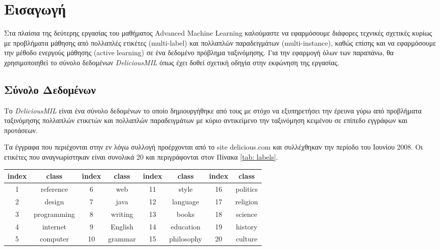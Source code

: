 \section{Εισαγωγή}
Στα πλαίσια της δεύτερης εργασίας του μαθήματος Advanced Machine Learning καλούμαστε να εφαρμόσουμε διάφορες τεχνικές σχετικές κυρίως με προβλήματα μάθησης από πολλαπλές ετικέτες (multi-label) και πολλαπλών παραδειγμάτων (multi-instance), καθώς επίσης και να εφαρμόσουμε την μέθοδο ενεργούς μάθησης (active learning) σε ένα δεδομένο πρόβλημα ταξινόμησης. 
Για την εφαρμογή όλων των παραπάνω, θα χρησιμοποιηθεί το σύνολο δεδομένων \emph{DeliciousMIL} όπως έχει δοθεί σχετική οδηγία στην εκφώνηση της εργασίας.

\subsection{Σύνολο Δεδομένων}
Το \emph{DeliciousMIL} είναι ένα σύνολο δεδομένων το οποίο δημιουργήθηκε από τους \cite{Soleimani} με στόχο να εξυπηρετήσει την έρευνα γύρω από προβλήματα ταξινόμησης πολλαπλών ετικετών και πολλαπλών παραδειγμάτων με κύριο αντικείμενο την ταξινόμηση κειμένου σε επίπεδο εγγράφων και προτάσεων.

Τα έγγραφα που περιέχονται στην εν λόγω συλλογή προέρχονται από το site delicious.com και συλλέχθηκαν την περίοδο του Ιουνίου 2008. Οι ετικέτες που αναγνωρίστηκαν είναι συνολικά 20 και περιγράφονται στον Πίνακα \ref{tab: labels}.

	\begin{table*}
	\centering
	\caption{Περιγραφή των Ετικετών}
	\label{tab: labels}
	\begin{tabular}{cccccccc}
		\hline
		\ttfamily index  & \ttfamily class & \ttfamily index  & \ttfamily class &
		\ttfamily index  & \ttfamily class & \ttfamily index  & \ttfamily class \\ \hline
		1 & reference	& 6	& web		&	11	&	style  & 16 & politics   \\ \hline
		2 & design		& 7	& java		&	12	&	language  & 17 & religion  \\ \hline
		3 & programming & 8	& writing	&	13	&	books  & 18 & science  \\ \hline
		4 & internet	& 9	& English	&	14	&	education  & 19 & history  \\ \hline
		5 & computer	& 10& grammar	&	15	&	philosophy  & 20 & culture \\ \hline
	\end{tabular}
\end{table*}


